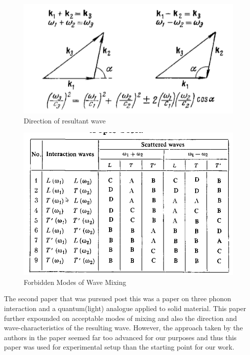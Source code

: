 \begin{figure}
\begin{center}
\includegraphics[scale=0.5]
{images/chapter_2/directions_noncollinear.png}
\caption{Direction of resultant wave\cite{zarem}}
\end{center}
\end{figure}

\begin{figure}
\begin{center}
\includegraphics[scale=0.5]
{images/chapter_2/interaction.png}
\caption{Forbidden Modes of Wave Mixing \cite{zarem}}
\end{center}
\end{figure}

The second paper that was pursued post this was a paper on three phonon interaction and a quantum(light) analogue applied to solid material. This paper further expounded on acceptable modes of mixing and also the direction and wave-characteristics of the resulting wave. However, the approach taken by the authors in the paper seemed far too advanced for our purposes and thus this paper was used for experimental setup than the starting point for our work.


